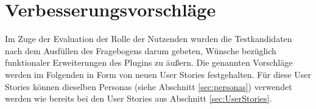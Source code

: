 

\section{Verbesserungsvorschläge}
\label{sec:Verbesserungsvorschlaege}
Im Zuge der Evaluation der Rolle der Nutzenden wurden die Testkandidaten nach dem Ausfüllen des Fragebogens darum gebeten, Wünsche bezüglich funktionaler Erweiterungen des Plugins zu äußern. Die genannten Vorschläge werden im Folgenden in Form von neuen User Stories festgehalten. Für diese User Stories können dieselben Personas (siehe Abschnitt \ref{sec:personas}) verwendet werden wie bereits bei den User Stories aus Abschnitt \ref{sec:UserStories}.

